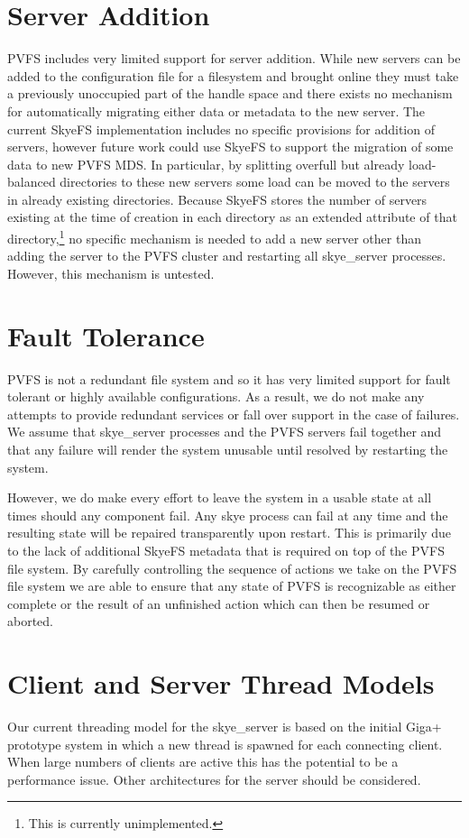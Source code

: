\documentclass[letterpaper]{article}
\begin{document}
\section{Server Addition}
PVFS includes very limited support for server addition.  While new servers can
be added to the configuration file for a filesystem and brought online they must
take a previously unoccupied part of the handle space and there exists no
mechanism for automatically migrating either data or metadata to the new server.
The current SkyeFS implementation includes no specific provisions for addition
of servers, however future work could use SkyeFS to support the migration of
some data to new PVFS MDS.  In particular, by splitting overfull but already
load-balanced directories to these new servers some load can be moved to the
servers in already existing directories.  Because SkyeFS stores the number of
servers existing at the time of creation in each directory as an extended
attribute of that directory,\footnote{This is currently unimplemented.} no
specific mechanism is needed to add a new server other than adding the server
to the PVFS cluster and restarting all skye\_\-server processes.  However,
this mechanism is untested.

\section{Fault Tolerance}
PVFS is not a redundant file system and so it has very limited support for fault
tolerant or highly available configurations.  As a result, we do not make any
attempts to provide redundant services or fall over support in the case of
failures.  We assume that skye\_\-server processes and the PVFS servers fail
together and that any failure will render the system unusable until resolved by
restarting the system.

However, we do make every effort to leave the system in a usable state at all
times should any component fail.  Any skye process can fail at any time and the
resulting state will be repaired transparently upon restart.  This is primarily
due to the lack of additional SkyeFS metadata that is required on top of the
PVFS file system.  By carefully controlling the sequence of actions we take on
the PVFS file system we are able to ensure that any state of PVFS is
recognizable as either complete or the result of an unfinished action which can
then be resumed or aborted.

\section{Client and Server Thread Models}
Our current threading model for the skye\_\-server is based on the initial Giga+
prototype system in which a new thread is spawned for each connecting client.
When large numbers of clients are active this has the potential to be a
performance issue.  Other architectures for the server should be considered. 
\end{document}

